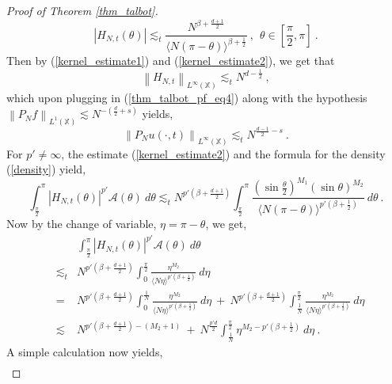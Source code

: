 \documentclass[12pt]{amsart}
\theoremstyle{definition}
\newcommand{\X}{\mathbb X}%
\numberwithin{equation}{section}
\begin{document}
\begin{proof}[Proof of Theorem \ref{thm_talbot}]
\begin{equation} \label{kernel_estimate2}
\left|H_{N,t}(\theta)\right| \lesssim_t \frac{N^{\beta+\frac{d+1}{2}}}{\langle N(\pi-\theta)\rangle^{\beta+\frac{1}{2}}}\:,\:\:\theta \in \left[\frac{\pi}{2},\pi\right]\:.
\end{equation}
Then by (\ref{kernel_estimate1}) and (\ref{kernel_estimate2}), we get that
\begin{equation*}
\left\|H_{N,t}\right\|_{L^\infty(\X)} \lesssim_t N^{d-\frac{1}{2}}\:,
\end{equation*}
which upon plugging in (\ref{thm_talbot_pf_eq4}) along with the hypothesis $\left\|P_Nf\right\|_{L^1(\X)} \lesssim N^{-\left(\frac{d}{2}+s\right)}$ yields,
\begin{equation}\label{L1_case}
\left\|P_Nu(\cdot,t)\right\|_{L^\infty(\X)} \lesssim_t N^{\frac{d-1}{2}-s}\:.
\end{equation}
For $p' \ne \infty$, the estimate (\ref{kernel_estimate2}) and the formula for the density (\ref{density}) yield,
\begin{equation*}
\int_{\frac{\pi}{2}}^\pi \left|H_{N,t}(\theta)\right|^{p'}\mathcal{A}(\theta)\:d\theta \lesssim_t N^{p'\left(\beta+\frac{d+1}{2}\right)}\int_{\frac{\pi}{2}}^\pi \frac{{\left(\sin \frac{\theta}{2}\right)}^{M_1} {(\sin \theta)}^{M_2}}{\langle N(\pi-\theta)\rangle^{p'\left(\beta+\frac{1}{2}\right)}}\:d\theta\:.
\end{equation*}
Now by the change of variable, $\eta=\pi-\theta$, we get,
\begin{eqnarray*}
&&\int_{\frac{\pi}{2}}^\pi \left|H_{N,t}(\theta)\right|^{p'}\mathcal{A}(\theta)\:d\theta \\
&\lesssim_t & N^{p'\left(\beta+\frac{d+1}{2}\right)} \int_0^{\frac{\pi}{2}} \frac{\eta^{M_2}}{\langle N\eta \rangle^{p'\left(\beta +\frac{1}{2}\right)}}\:d\eta \\
&=& N^{p'\left(\beta+\frac{d+1}{2}\right)} \int_0^{\frac{1}{N}} \frac{\eta^{M_2}}{\langle N\eta \rangle^{p'\left(\beta +\frac{1}{2}\right)}}\:d\eta \:+\:N^{p'\left(\beta+\frac{d+1}{2}\right)} \int_{\frac{1}{N}}^{\frac{\pi}{2}} \frac{\eta^{M_2}}{\langle N\eta \rangle^{p'\left(\beta +\frac{1}{2}\right)}}\:d\eta \\
& \lesssim & N^{p'\left(\beta+\frac{d+1}{2}\right)-(M_2+1)}\:+\:N^{\frac{p'd}{2}}\int_{\frac{1}{N}}^{\frac{\pi}{2}} \eta^{M_2-p'\left(\beta+\frac{1}{2}\right)}\:d\eta\:.
\end{eqnarray*}
A simple calculation now yields,
\begin{eqnarray} \label{thm_talbot_pf_eq12}

\end{eqnarray}
\end{proof}
\end{document}
